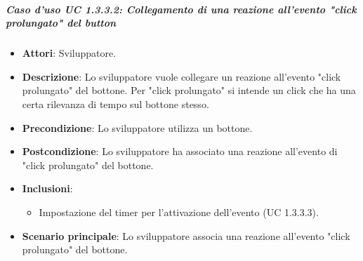 \subparagraph{Caso d'uso UC 1.3.3.2: Collegamento di una reazione all'evento "click prolungato" del button}

\FloatBarrier
\begin{itemize}
\item\textbf{Attori}: Sviluppatore.
\item\textbf{Descrizione}: Lo sviluppatore vuole collegare un reazione all'evento "click prolungato" del bottone. Per "click prolungato" si intende un click che ha una certa rilevanza di tempo sul bottone stesso.
\item\textbf{Precondizione}: Lo sviluppatore utilizza un bottone.
\item\textbf{Postcondizione}: Lo sviluppatore ha associato una reazione all'evento di "click prolungato" del bottone.
\item \textbf{Inclusioni}:
\begin{itemize}
\item Impostazione del timer per l'attivazione dell'evento (UC 1.3.3.3).
\end{itemize} 
\item\textbf{Scenario principale}: Lo sviluppatore associa una reazione all'evento "click prolungato" del bottone.
\end{itemize}

